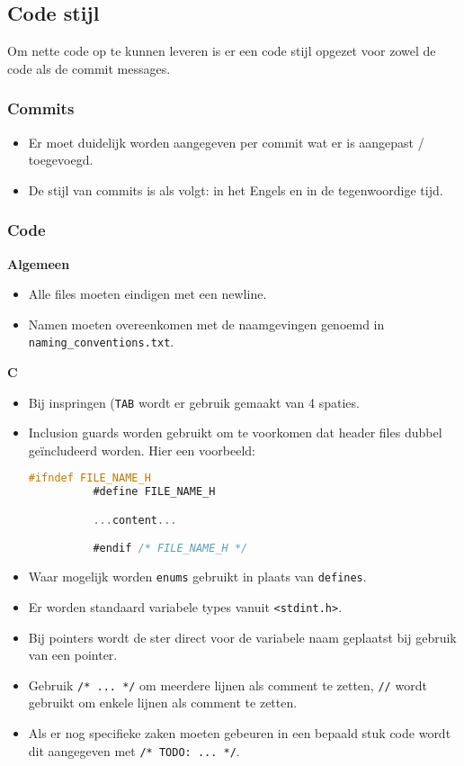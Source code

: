 \subsection{Code stijl}
Om nette code op te kunnen leveren is er een code stijl opgezet voor zowel 
de code als de commit messages.

\subsubsection{Commits}
\begin{itemize}
    \item Er moet duidelijk worden aangegeven per commit wat er is aangepast / 
          toegevoegd.
    \item De stijl van commits is als volgt: in het Engels en in de tegenwoordige
          tijd.
\end{itemize}

\subsubsection{Code}
\textbf{Algemeen}

\begin{itemize}
  \item Alle files moeten eindigen met een newline.
  \item Namen moeten overeenkomen met de naamgevingen genoemd in 
        \texttt{naming_conventions.txt}.
\end{itemize}

\textbf{C}
\begin{itemize}
  \item Bij inspringen (\texttt{TAB} wordt er gebruik gemaakt van 4 spaties.
  \item Inclusion guards worden gebruikt om te voorkomen dat header files dubbel
        geïncludeerd worden. Hier een voorbeeld:
        \begin{lstlisting}[language=C,frame=single]
          #ifndef FILE_NAME_H
          #define FILE_NAME_H

          ...content...

          #endif /* FILE_NAME_H */
        \end{lstlisting}
  \item Waar mogelijk worden \texttt{enums} gebruikt in plaats van \texttt{defines}.
  \item Er worden standaard variabele types vanuit \texttt{<stdint.h>}.
  \item Bij pointers wordt de ster direct voor de variabele naam geplaatst
        bij gebruik van een pointer.
  \item Gebruik \texttt{/* ... */} om meerdere lijnen als comment te zetten,
        \texttt{//} wordt gebruikt om enkele lijnen als comment te zetten.
  \item Als er nog specifieke zaken moeten gebeuren in een bepaald stuk code wordt
        dit aangegeven met \texttt{/* TODO: ... */}.
\end{itemize}
